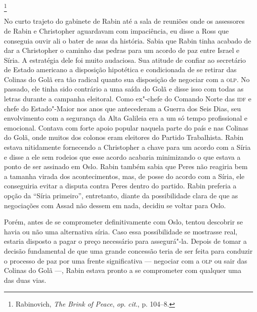 \footnote{Rabinovich, \textit{The Brink of Peace}, \textit{op}.
\textit{cit}., p. 104--8.}

No curto trajeto do gabinete de Rabin até a sala de reuniões onde os
assessores de Rabin e Christopher aguardavam com impaciência, eu disse a
Ross que conseguia ouvir ali o bater de asas da história. Sabia que
Rabin tinha acabado de dar a Christopher o caminho das pedras para um
acordo de paz entre Israel e Síria. A estratégia dele foi muito
audaciosa. Sua atitude de confiar ao secretário de Estado americano a
disposição hipotética e condicionada de se retirar das Colinas do Golã
era tão radical quanto sua disposição de negociar com a \textsc{olp}. No passado,
ele tinha sido contrário a uma saída do Golã e disse isso com todas as
letras durante a campanha eleitoral. Como ex"-chefe do Comando Norte
das \textsc{idf} e chefe do Estado"-Maior nos anos que antecederam a Guerra dos
Seis Dias, seu envolvimento com a segurança da Alta Galileia era a um só
tempo profissional e emocional. Contava com forte apoio popular naquela
parte do país e nas Colinas do Golã, onde muitos dos colonos eram
eleitores do Partido Trabalhista. Rabin estava nitidamente fornecendo a
Christopher a chave para um acordo com a Síria e disse a ele sem rodeios
que esse acordo acabaria minimizando o que estava a ponto de ser
assinado em Oslo. Rabin também sabia que Peres não reagiria bem a
tamanha virada dos acontecimentos, mas, de posse do acordo com a Síria,
ele conseguiria evitar a disputa contra Peres dentro do partido. Rabin
preferia a opção da ``Síria primeiro'', entretanto, diante da possibilidade
clara de que as negociações com Assad não dessem em nada, decidiu se
voltar para Oslo.

Porém, antes de se comprometer definitivamente com Oslo, tentou
descobrir se havia ou não uma alternativa síria. Caso essa possibilidade
se mostrasse real, estaria disposto a pagar o preço necessário para
assegurá"-la. Depois de tomar a decisão fundamental de que uma grande
concessão teria de ser feita para conduzir o processo de paz por uma
frente significativa --- negociar com a \textsc{olp} ou sair das Colinas do Golã
---, Rabin estava pronto a se comprometer com qualquer uma das duas vias.


